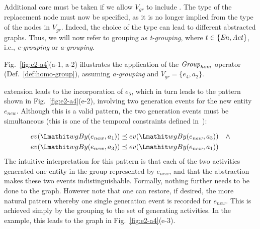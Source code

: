 Additional care must be taken if we allow $V_{gr}$ to include .  The type of the replacement node must now be specified, as it is no longer implied from the type of the nodes in $V_{gr}$. Indeed,  the choice of the type can lead to different abstracted graphs. Thus, we will now refer to grouping as \textit{t-grouping}, where $t \in \{ \mathit{En}, \mathit{Act}\}$, i.e., \textit{e-grouping} or \textit{a-grouping}.

Fig.~\ref{fig:e2-a4}(a-1, a-2) illustrates the application of the $\mathit{Group}_{hom}$ operator (Def.~\ref{def:homo-group}), assuming \textit{a-grouping} and $V_{gr} = \{ e_4, a_2\}$.


%
   extension leads to the incorporation of $e_5$, which in turn leads to the pattern shown in Fig.~\ref{fig:e2-a4}(e-2), involving two generation events for the new entity $e_{new}$.
Although this is a valid pattern, the two generation events must be simultaneous (this is one of the temporal constraints defined in~\citep{w3c-prov-constraints}): 

\begin{align}
ev(\wgby(e_{new}, a_1)) & \preorder ev(\wgby(e_{new}, a_3))  \quad \wedge \\
ev(\wgby(e_{new}, a_3)) & \preorder ev(\wgby(e_{new}, a_1))
\end{align}
The intuitive interpretation for this pattern is that each of the two activities generated one entity in the group represented by $e_{new}$, and that the abstraction makes these two events indistinguishable.  Formally, nothing further needs to be done to the graph.   However note that one can restore, if desired, the more natural pattern whereby one single generation event is recorded for $e_{new}$. This is achieved simply by  the grouping to the set of generating activities.
In the example, this leads to the graph in Fig.~\ref{fig:e2-a4}(e-3).  

